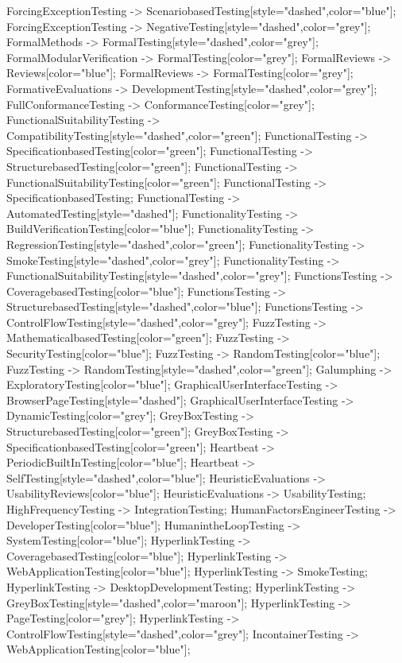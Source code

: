 \documentclass{article}
\begin{document}
{ForcingExceptionTesting -> ScenariobasedTesting[style="dashed",color="blue"];
ForcingExceptionTesting -> NegativeTesting[style="dashed",color="grey"];
FormalMethods -> FormalTesting[style="dashed",color="grey"];
FormalModularVerification -> FormalTesting[color="grey"];
FormalReviews -> Reviews[color="blue"];
FormalReviews -> FormalTesting[color="grey"];
FormativeEvaluations -> DevelopmentTesting[style="dashed",color="grey"];
FullConformanceTesting -> ConformanceTesting[color="grey"];
FunctionalSuitabilityTesting -> CompatibilityTesting[style="dashed",color="green"];
FunctionalTesting -> SpecificationbasedTesting[color="green"];
FunctionalTesting -> StructurebasedTesting[color="green"];
FunctionalTesting -> FunctionalSuitabilityTesting[color="green"];
FunctionalTesting -> SpecificationbasedTesting;
FunctionalTesting -> AutomatedTesting[style="dashed"];
FunctionalityTesting -> BuildVerificationTesting[color="blue"];
FunctionalityTesting -> RegressionTesting[style="dashed",color="green"];
FunctionalityTesting -> SmokeTesting[style="dashed",color="grey"];
FunctionalityTesting -> FunctionalSuitabilityTesting[style="dashed",color="grey"];
FunctionsTesting -> CoveragebasedTesting[color="blue"];
FunctionsTesting -> StructurebasedTesting[style="dashed",color="blue"];
FunctionsTesting -> ControlFlowTesting[style="dashed",color="grey"];
FuzzTesting -> MathematicalbasedTesting[color="green"];
FuzzTesting -> SecurityTesting[color="blue"];
FuzzTesting -> RandomTesting[color="blue"];
FuzzTesting -> RandomTesting[style="dashed",color="green"];
Galumphing -> ExploratoryTesting[color="blue"];
GraphicalUserInterfaceTesting -> BrowserPageTesting[style="dashed"];
GraphicalUserInterfaceTesting -> DynamicTesting[color="grey"];
GreyBoxTesting -> StructurebasedTesting[color="green"];
GreyBoxTesting -> SpecificationbasedTesting[color="green"];
Heartbeat -> PeriodicBuiltInTesting[color="blue"];
Heartbeat -> SelfTesting[style="dashed",color="blue"];
HeuristicEvaluations -> UsabilityReviews[color="blue"];
HeuristicEvaluations -> UsabilityTesting;
HighFrequencyTesting -> IntegrationTesting;
HumanFactorsEngineerTesting -> DeveloperTesting[color="blue"];
HumanintheLoopTesting -> SystemTesting[color="blue"];
HyperlinkTesting -> CoveragebasedTesting[color="blue"];
HyperlinkTesting -> WebApplicationTesting[color="blue"];
HyperlinkTesting -> SmokeTesting;
HyperlinkTesting -> DesktopDevelopmentTesting;
HyperlinkTesting -> GreyBoxTesting[style="dashed",color="maroon"];
HyperlinkTesting -> PageTesting[color="grey"];
HyperlinkTesting -> ControlFlowTesting[style="dashed",color="grey"];
IncontainerTesting -> WebApplicationTesting[color="blue"];
}
\end{document}
